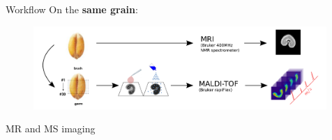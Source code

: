 \documentclass[10pt]{beamer}
\begin{document}
\begin{frame}{Workflow}
  On the \textbf{same grain}:

  \begin{figure}[ht]
    \centering
    \includegraphics[width=0.99\textwidth]{fig/ms_workflow}
  \end{figure}

\end{frame}

\begin{frame}{MR and MS imaging}


\end{frame}
\end{document}
